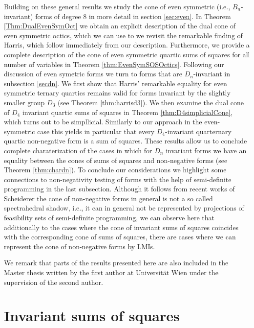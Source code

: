 \documentclass[11pt,a4paper]{amsart}
\numberwithin{equation}{section}
\theoremstyle{definition}
\numberwithin{thm}{section}
\theoremstyle{break}
\numberwithin{subcase}{case}
\begin{document}
Building on these general results we study the cone of even symmetric (i.e., $B_n$-invariant) forms of degree 8 in more detail in section \ref{sec:even}. In Theorem \ref{Thm:DualEvenSymOct} we obtain an explicit description of the dual cone of even symmetric octics, which we can use to we revisit the remarkable finding of Harris, which follow immediately from our description. Furthermore, we provide a complete description of the cone of even symmetric quartic sums of squares for all number of variables in Theorem \ref{thm:EvenSymSOSOctics}. Following our discussion of even symetric forms we turn to forms that are $D_n$-invariant in subsection \ref{secdn}. We first show that  Harris' remarkable equality for even symmetric ternary quartics  remains valid for forms invariant by the slightly smaller group $D_3$ (see Theorem \ref{thm:harrisd3}).  We then examine the dual cone of $D_4$ invariant quartic sums of squares in Theorem \ref{thm:D4simplicialCone}, which turns out to be simpllicial. Similarly to our approach in the even-symmetric case this yields in particular that every $D_4$-invariant quarternary quartic non-negative form is a sum of squares. These results allow us to conclude complete charaterization of the cases in which for $D_n$ invariant forms we have an equality between the cones of  sums of squares and non-negative forms (see Theorem \ref{thm:chardn}). To conclude our considerations we highlight some connections to non-negativity testing of forms with the help of semi-definite programming in the last subsection. Although it follows from recent works of Scheiderer \cite{scheiderer} the cone of non-negative forms in general is not a so called spectrahedral shadow, i.e., it can in general not be represented by projections of feasibility sets of semi-definite programming, we can observe here that additionally to the cases where the cone of invariant sums of squares coincides with the corresponding cone of sums of squares, there are cases where we can represent the cone of non-negative forms by LMIs.

\smallskip
We remark that parts of the results presented here are also included in the Master thesis \cite{mastersthesis} written by  the first author at Universit\"at Wien under the supervision of the second author.


\section{Invariant sums of squares}
\end{document}
